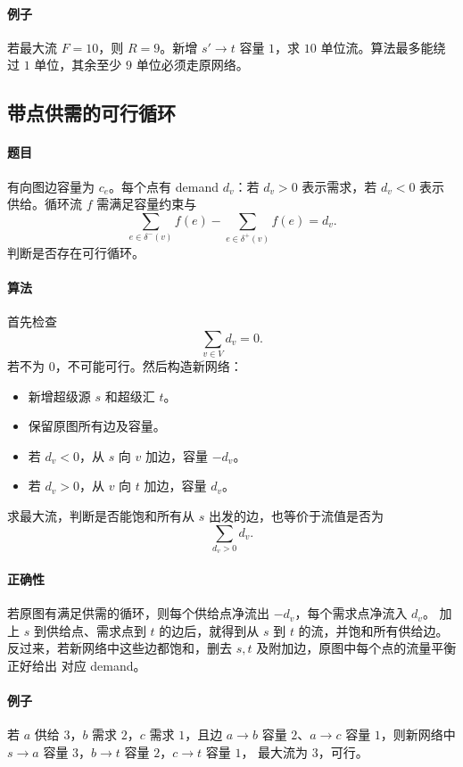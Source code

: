 \documentclass[UTF8,openany,12pt]{ctexbook}
\theoremstyle{remark}
\begin{document}
\paragraph{例子}
若最大流 $F=10$，则 $R=9$。新增 $s'\to t$ 容量 $1$，求 $10$ 单位流。算法最多能绕过
$1$ 单位，其余至少 $9$ 单位必须走原网络。

\subsection{带点供需的可行循环}

\paragraph{题目}
有向图边容量为 $c_e$。每个点有 demand $d_v$：若 $d_v>0$ 表示需求，若
$d_v<0$ 表示供给。循环流 $f$ 需满足容量约束与
\[
  \sum_{e\in \delta^-(v)}f(e)-\sum_{e\in\delta^+(v)}f(e)=d_v.
\]
判断是否存在可行循环。

\paragraph{算法}
首先检查
\[
  \sum_{v\in V}d_v=0.
\]
若不为 $0$，不可能可行。然后构造新网络：
\begin{itemize}
  \item 新增超级源 $s$ 和超级汇 $t$。
  \item 保留原图所有边及容量。
  \item 若 $d_v<0$，从 $s$ 向 $v$ 加边，容量 $-d_v$。
  \item 若 $d_v>0$，从 $v$ 向 $t$ 加边，容量 $d_v$。
\end{itemize}
求最大流，判断是否能饱和所有从 $s$ 出发的边，也等价于流值是否为
\[
  \sum_{d_v>0}d_v.
\]

\paragraph{正确性}
若原图有满足供需的循环，则每个供给点净流出 $-d_v$，每个需求点净流入 $d_v$。
加上 $s$ 到供给点、需求点到 $t$ 的边后，就得到从 $s$ 到 $t$ 的流，并饱和所有供给边。
反过来，若新网络中这些边都饱和，删去 $s,t$ 及附加边，原图中每个点的流量平衡正好给出
对应 demand。

\paragraph{例子}
若 $a$ 供给 $3$，$b$ 需求 $2$，$c$ 需求 $1$，且边 $a\to b$ 容量 $2$、$a\to c$
容量 $1$，则新网络中 $s\to a$ 容量 $3$，$b\to t$ 容量 $2$，$c\to t$ 容量 $1$，
最大流为 $3$，可行。
\end{document}
